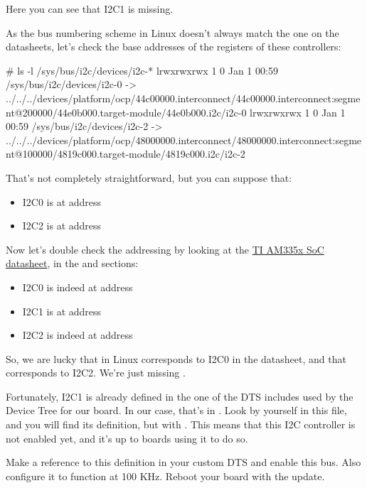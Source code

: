 Here you can see that I2C1 is missing.

As the bus numbering scheme in Linux doesn't always match the one
on the datasheets, let's check the base addresses of the registers
of these controllers:

\begin{bashinput}
# ls -l /sys/bus/i2c/devices/i2c-*
lrwxrwxrwx    1         0 Jan  1 00:59 /sys/bus/i2c/devices/i2c-0 -> ../../../devices/platform/ocp/44c00000.interconnect/44c00000.interconnect:segment@200000/44e0b000.target-module/44e0b000.i2c/i2c-0
lrwxrwxrwx    1         0 Jan  1 00:59 /sys/bus/i2c/devices/i2c-2 -> ../../../devices/platform/ocp/48000000.interconnect/48000000.interconnect:segment@100000/4819c000.target-module/4819c000.i2c/i2c-2
\end{bashinput}

That's not completely straightforward, but you can suppose that:
\begin{itemize}
\item I2C0 is at address 
\item I2C2 is at address 
\end{itemize}

Now let's double check the addressing by looking at the
\href{https://www.ti.com/lit/ug/spruh73q/spruh73q.pdf}{TI AM335x SoC
datasheet}, in the  and  sections:

\begin{itemize}
\item I2C0 is indeed at address 
\item I2C1 is at address 
\item I2C2 is indeed at address 
\end{itemize}

So, we are lucky that  in Linux corresponds to I2C0 in the
datasheet, and that  corresponds to I2C2.
We're just missing .

Fortunately, I2C1 is already defined in the one of the DTS includes
used by the Device Tree for our board. In our case, that's in
. Look by yourself in this
file, and you will find its definition, but with . This means that this I2C controller is not enabled yet,
and it's up to boards using it to do so.

Make a reference to this definition in your custom DTS and enable this
bus. Also configure it to function at 100 KHz. Reboot your board with
the update.

